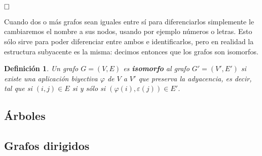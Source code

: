 \documentclass[12pt]{article}
\newtheorem{definition}[theorem]{Definición}
\begin{document}
$\hfill \square$

Cuando dos o más grafos sean iguales entre sí para diferenciarlos simplemente le cambiaremos el nombre a sus nodos, usando por ejemplo números o letras. Esto sólo sirve para poder diferenciar entre ambos e identificarlos, pero en realidad la estructura subyacente es la misma: decimos entonces que los grafos son isomorfos.

\begin{definition}Un grafo $G = (V,E)$ es \textbf{isomorfo} al grafo $G' = (V', E')$ si existe una aplicación biyectiva $\varphi$ de $V$ a $V'$ que preserva la adyacencia, es decir, tal que si $(i,j) \in E$ si y sólo si $(\varphi(i), \varepsilon(j) )  \in E'$.
\end{definition}


\subsection{Árboles}
\subsection{Grafos dirigidos}
\end{document}
